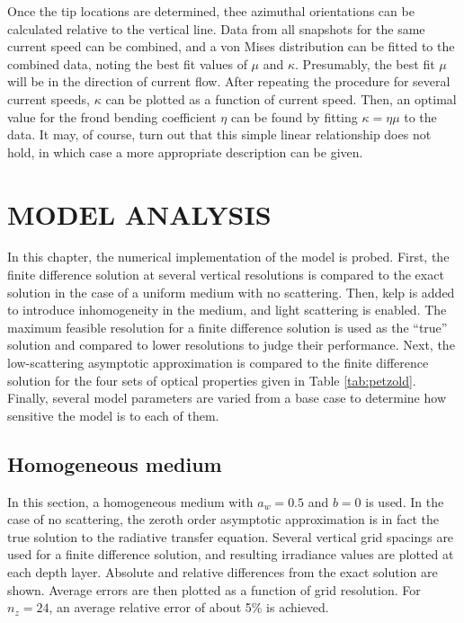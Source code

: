 \documentclass[ms,cpyr,lof,lot]{uathesis}
\begin{document}
Once the tip locations are determined, thee azimuthal orientations can be calculated relative to the vertical line.
Data from all snapshots for the same current speed can be combined, and a von Mises distribution can be fitted to the combined data,
noting the best fit values of $\mu$ and $\kappa$.
Presumably, the best fit $\mu$ will be in the direction of current flow.
After repeating the procedure for several current speeds, $\kappa$ can be plotted as a function of current speed.
Then, an optimal value for the frond bending coefficient $\eta$ can be found by fitting $\kappa = \eta\mu$ to the data.
It may, of course, turn out that this simple linear relationship does not hold, in which case a more appropriate description can be given.
 \chapter{MODEL ANALYSIS}
\label{chap:model_analysis}

In this chapter, the numerical implementation of the model is probed.
First, the finite difference solution at several vertical resolutions
is compared to the exact solution in the case of a uniform medium with no scattering.
Then, kelp is added to introduce inhomogeneity in the medium, and light scattering is enabled.
The maximum feasible resolution for a finite difference solution is used as the ``true'' solution
and compared to lower resolutions to judge their performance.
Next, the low-scattering asymptotic approximation is compared to the finite difference solution
for the four sets of optical properties given in Table \ref{tab:petzold}.
Finally, several model parameters are varied from a base case to determine how sensitive the model is to each of them. 


\section{Homogeneous medium}
In this section, a homogeneous medium with $a_w=0.5$ and $b=0$ is used.
In the case of no scattering, the zeroth order asymptotic approximation
is in fact the true solution to the radiative transfer equation.
Several vertical grid spacings are used for a finite difference solution,
and resulting irradiance values are plotted at each depth layer.
Absolute and relative differences from the exact solution are shown.
Average errors are then plotted as a function of grid resolution.
For $n_z=24$, an average relative error of about 5\% is achieved.
\end{document}
